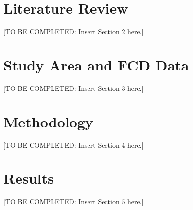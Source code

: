 \documentclass[pdflatex,sn-mathphys-num,iicol]{sn-jnl}
\begin{document}
\section{Literature Review}\label{sec:literature}

[TO BE COMPLETED: Insert Section 2 here.]

\section{Study Area and FCD Data}\label{sec:data}

[TO BE COMPLETED: Insert Section 3 here.]

\section{Methodology}\label{sec:methodology}

[TO BE COMPLETED: Insert Section 4 here.]

%
%

\section{Results}\label{sec:results}

[TO BE COMPLETED: Insert Section 5 here.]


%
\end{document}

